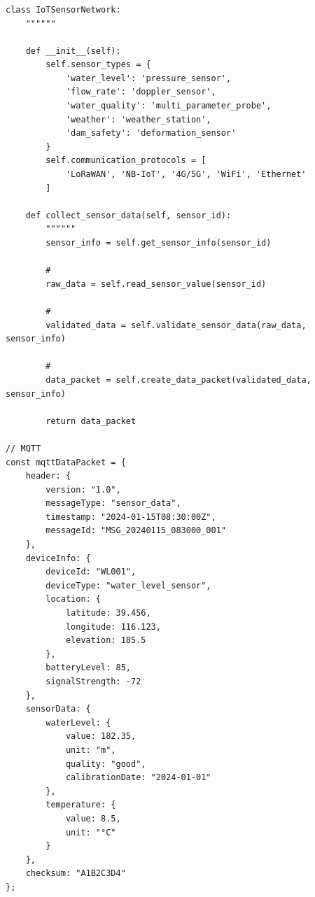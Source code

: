 \hypertarget{section-69}{%
\subsubsection{}\label{section-69}}

\hypertarget{section-70}{%
\paragraph{}\label{section-70}}

\begin{lstlisting}[style=python]
class IoTSensorNetwork:
    """"""
    
    def __init__(self):
        self.sensor_types = {
            'water_level': 'pressure_sensor',
            'flow_rate': 'doppler_sensor', 
            'water_quality': 'multi_parameter_probe',
            'weather': 'weather_station',
            'dam_safety': 'deformation_sensor'
        }
        self.communication_protocols = [
            'LoRaWAN', 'NB-IoT', '4G/5G', 'WiFi', 'Ethernet'
        ]
    
    def collect_sensor_data(self, sensor_id):
        """"""
        sensor_info = self.get_sensor_info(sensor_id)
        
        # 
        raw_data = self.read_sensor_value(sensor_id)
        
        # 
        validated_data = self.validate_sensor_data(raw_data, sensor_info)
        
        # 
        data_packet = self.create_data_packet(validated_data, sensor_info)
        
        return data_packet
\end{lstlisting}

\hypertarget{section-71}{%
\paragraph{}\label{section-71}}

\begin{lstlisting}[style=javascript]
// MQTT
const mqttDataPacket = {
    header: {
        version: "1.0",
        messageType: "sensor_data",
        timestamp: "2024-01-15T08:30:00Z",
        messageId: "MSG_20240115_083000_001"
    },
    deviceInfo: {
        deviceId: "WL001",
        deviceType: "water_level_sensor",
        location: {
            latitude: 39.456,
            longitude: 116.123,
            elevation: 185.5
        },
        batteryLevel: 85,
        signalStrength: -72
    },
    sensorData: {
        waterLevel: {
            value: 182.35,
            unit: "m",
            quality: "good",
            calibrationDate: "2024-01-01"
        },
        temperature: {
            value: 8.5,
            unit: "°C"
        }
    },
    checksum: "A1B2C3D4"
};
\end{lstlisting}

